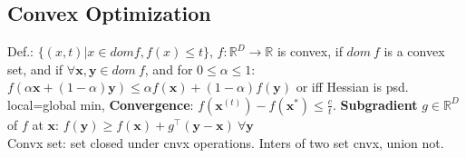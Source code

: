 \subsection*{Convex Optimization}
Def.: $\{(x,t)|x \in dom f, f(x) \leq t\}$, $f : \mathbb{R}^D \rightarrow \mathbb{R}$ is convex, if $dom\ f$ is a convex set, and if $\forall \mathbf{x}, \mathbf{y} \in dom\ f$, and for $0 \leq \alpha \leq 1$: $f(\alpha \mathbf{x} + (1 - \alpha)\mathbf{y}) \leq \alpha f(\mathbf{x}) + (1-\alpha)f(\mathbf{y})$ or iff Hessian is psd. local=global min, \textbf{Convergence}: $f(\mathbf{x}^{(t)}) - f(\mathbf{x}^*) \le \frac{c}{t}$.
\textbf{Subgradient} $g \in \mathbb{R}^D$ of $f$ at $\mathbf{x}$: $f(\mathbf{y}) \geq f(\mathbf{x}) + g^\top(\mathbf{y}-\mathbf{x}) \ \forall \mathbf{y}$\\
Convx set: set closed under cnvx operations. Inters of two set cnvx, union not.

